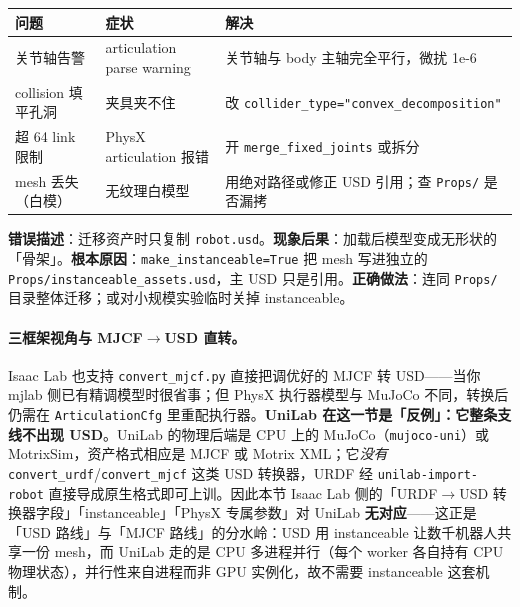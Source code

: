 \begin{center}
\small
\begin{tabular}{@{}llp{4.4cm}@{}}
\toprule
问题 & 症状 & 解决 \\
\midrule
关节轴告警 & articulation parse warning & 关节轴与 body 主轴完全平行，微扰 1e-6 \\
collision 填平孔洞 & 夹具夹不住 & 改 \texttt{collider\_type="convex\_decomposition"} \\
超 64 link 限制 & PhysX articulation 报错 & 开 \texttt{merge\_fixed\_joints} 或拆分 \\
mesh 丢失（白模） & 无纹理白模型 & 用绝对路径或修正 USD 引用；查 \texttt{Props/} 是否漏拷 \\
\bottomrule
\end{tabular}
\end{center}

\begin{pitfall}
\textbf{错误描述}：迁移资产时只复制 \texttt{robot.usd}。\textbf{现象后果}：加载后模型变成无形状的「骨架」。\textbf{根本原因}：\texttt{make\_instanceable=True} 把 mesh 写进独立的 \texttt{Props/instanceable\_assets.usd}，主 USD 只是引用。\textbf{正确做法}：连同 \texttt{Props/} 目录整体迁移；或对小规模实验临时关掉 instanceable。
\end{pitfall}

\paragraph{三框架视角与 \texorpdfstring{MJCF$\to$USD}{MJCF-USD} 直转。}Isaac Lab 也支持 \texttt{convert\_mjcf.py} 直接把调优好的 MJCF 转 USD——当你 mjlab 侧已有精调模型时很省事；但 PhysX 执行器模型与 MuJoCo 不同，转换后仍需在 \texttt{ArticulationCfg} 里重配执行器。\textbf{UniLab 在这一节是「反例」：它整条支线不出现 USD}。UniLab 的物理后端是 CPU 上的 MuJoCo（\texttt{mujoco-uni}）或 MotrixSim，资产格式相应是 MJCF 或 Motrix XML；它\emph{没有} \texttt{convert\_urdf}/\texttt{convert\_mjcf} 这类 USD 转换器，URDF 经 \texttt{unilab-import-robot} 直接导成原生格式即可上训。因此本节 Isaac Lab 侧的「URDF$\to$USD 转换器字段」「instanceable」「PhysX 专属参数」对 UniLab \textbf{无对应}——这正是「USD 路线」与「MJCF 路线」的分水岭：USD 用 instanceable 让数千机器人共享一份 mesh，而 UniLab 走的是 CPU 多进程并行（每个 worker 各自持有 CPU 物理状态），并行性来自进程而非 GPU 实例化，故不需要 instanceable 这套机制。

